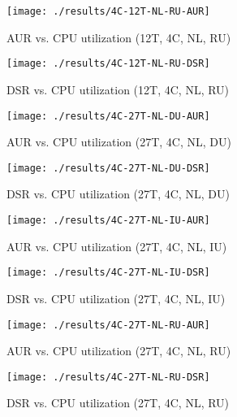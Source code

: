 \documentclass[12pt,dvips]{report}
\begin{document}
 
 
\begin{figure} [htbp]
  \centering
  \texttt{[image: ./results/4C-12T-NL-RU-AUR]}
  \caption{AUR vs. CPU utilization (12T, 4C, NL, RU)}
  \label{fig:4C-12T-NL-RU-AUR}
\end{figure}
 
 
 
\begin{figure} [htbp]
  \centering
  \texttt{[image: ./results/4C-12T-NL-RU-DSR]}
  \caption{DSR vs. CPU utilization (12T, 4C, NL, RU)}
  \label{fig:4C-12T-NL-RU-DSR}
\end{figure}
 
\begin{figure} [htbp]
  \centering
  \texttt{[image: ./results/4C-27T-NL-DU-AUR]}
  \caption{AUR vs. CPU utilization (27T, 4C, NL, DU)}
  \label{fig:4C-27T-NL-DU-AUR}
\end{figure}
 
 
 
\begin{figure} [htbp]
  \centering
  \texttt{[image: ./results/4C-27T-NL-DU-DSR]}
  \caption{DSR vs. CPU utilization (27T, 4C, NL, DU)}
  \label{fig:4C-27T-NL-DU-DSR}
\end{figure}
 
 
 
\begin{figure} [htbp]
  \centering
  \texttt{[image: ./results/4C-27T-NL-IU-AUR]}
  \caption{AUR vs. CPU utilization (27T, 4C, NL, IU)}
  \label{fig:4C-27T-NL-IU-AUR}
\end{figure}
 
 
 
\begin{figure} [htbp]
  \centering
  \texttt{[image: ./results/4C-27T-NL-IU-DSR]}
  \caption{DSR vs. CPU utilization (27T, 4C, NL, IU)}
  \label{fig:4C-27T-NL-IU-DSR}
\end{figure}
 
 
 
\begin{figure} [htbp]
  \centering
  \texttt{[image: ./results/4C-27T-NL-RU-AUR]}
  \caption{AUR vs. CPU utilization (27T, 4C, NL, RU)}
  \label{fig:4C-27T-NL-RU-AUR}
\end{figure}
 
 
 
\begin{figure} [htbp]
  \centering
  \texttt{[image: ./results/4C-27T-NL-RU-DSR]}
  \caption{DSR vs. CPU utilization (27T, 4C, NL, RU)}
  \label{fig:4C-27T-NL-RU-DSR}
\end{figure}
\end{document}
